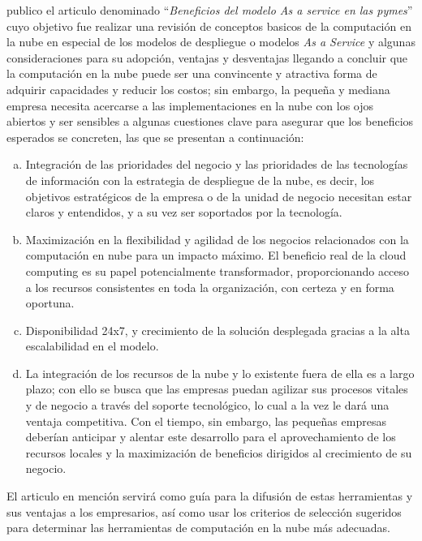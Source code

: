 \cite{jrodriguez} publico el articulo denominado ``\emph{Beneficios del modelo As a
service en las pymes}'' cuyo objetivo fue realizar una revisi\'on de conceptos
basicos de la computaci\'on en la nube en especial de los modelos de despliegue
o modelos \emph{As a Service} y algunas consideraciones para su adopci\'on, ventajas
y desventajas llegando a concluir que la computaci\'on en la nube puede ser una
convincente y atractiva forma de adquirir capacidades y reducir los costos; sin
embargo, la peque\~na y mediana empresa necesita acercarse a las implementaciones
en la nube con los ojos abiertos y ser sensibles a algunas cuestiones clave para
asegurar que los beneficios esperados se concreten, las que se presentan a
continuaci\'on:
\begin{enumerate}[a.]
    \item Integraci\'on de las prioridades del negocio y las prioridades de las
          tecnolog\'ias de informaci\'on con la estrategia de despliegue de la
          nube, es decir, los objetivos estrat\'egicos de la empresa o de la
          unidad de negocio necesitan estar claros y entendidos, y a su vez ser
          soportados por la tecnolog\'ia.
    \item Maximizaci\'on en la flexibilidad y agilidad de los negocios
          relacionados con la computaci\'on en nube para un impacto m\'aximo.
          El beneficio real de la cloud computing es su papel potencialmente
          transformador, proporcionando acceso a los recursos consistentes en
          toda la organizaci\'on, con certeza y en forma oportuna.
    \item Disponibilidad 24x7, y crecimiento de la soluci\'on desplegada gracias
          a la alta escalabilidad en el modelo.
    \item La integraci\'on de los recursos de la nube y lo existente fuera de
          ella es a largo plazo; con ello se busca que las empresas puedan agilizar
          sus procesos vitales y de negocio a trav\'es del soporte tecnol\'ogico,
          lo cual a la vez le dar\'a una ventaja competitiva. Con el tiempo, sin
          embargo, las peque\~nas empresas deber\'ian anticipar y alentar este
          desarrollo para el aprovechamiento de los recursos locales y la maximizaci\'on
          de beneficios dirigidos al crecimiento de su negocio.
\end{enumerate}

El articulo en menci\'on servir\'a como gu\'ia para la difusi\'on de estas herramientas
y sus ventajas a los empresarios, as\'i como usar los criterios de selecci\'on
sugeridos para determinar las herramientas de computaci\'on en la nube m\'as
adecuadas.

